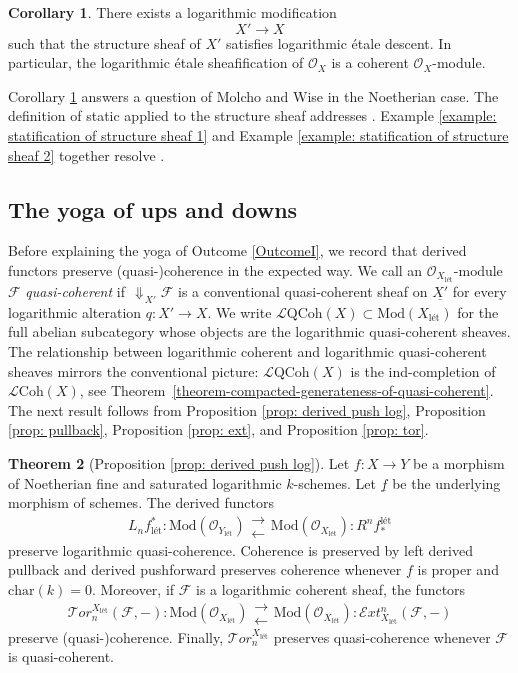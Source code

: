 \documentclass[11pt]{amsart}
\theoremstyle{definition}
\theoremstyle{definition}
\newtheorem{maintheorem}{Theorem}
\newtheorem{maincorollary}[maintheorem]{Corollary}
\DeclareMathOperator{\arrowdown}{\!\Downarrow\!}
\newcommand{\cE}{\mathcal{E}}
\newcommand{\cF}{\mathcal{F}}
\newcommand{\cL}{\mathcal{L}}
\newcommand{\cT}{\mathcal{T}}
\newcommand{\cal}{\mathcal}
\def\cE{{\cal E}}
\def\cF{{\cal F}}
\def\cL{{\cal L}}
\def\cT{{\cal T}}
\newcommand{\logqcoh}[1]{\cL \text{QCoh}(#1)}
\newcommand{\logcoh}[1]{\cL \text{Coh}(#1)}
\newcommand{\longleftrightarrows}{\mathrel{\substack{\textstyle\longrightarrow \\[-0.3ex] \textstyle\longleftarrow}}}
\begin{document}
\begin{maincorollary}\label{main corr:addressing Molcho Wise}
    There exists a logarithmic modification $$X'\longrightarrow X$$ such that the structure sheaf of $X'$ satisfies logarithmic \'etale descent. In particular, the logarithmic \'etale sheafification of $\mathcal{O}_X$ is a coherent $\mathcal{O}_X$-module.
\end{maincorollary}

Corollary \ref{main corr:addressing Molcho Wise} answers a question of Molcho and Wise \cite[Question 1.7.1]{molcho2023remarks} in the Noetherian case. The definition of static applied to the structure sheaf addresses \cite[Question 1.7.2]{molcho2023remarks}. Example \ref{example: statification of structure sheaf 1} and Example \ref{example: statification of structure sheaf 2} together resolve \cite[Question 1.7.3]{molcho2023remarks}. 

\subsection{The yoga of ups and downs} 
Before explaining the yoga of Outcome \ref{OutcomeI}, we record that derived functors preserve (quasi-)coherence in the expected way. We call an $\mathcal{O}_{X_{\text{l\'et}}}\text{-module}$ $\mathcal{F}$ \textit{quasi-coherent} if $\arrowdown_{X'}\!\mathcal{F}$
    is a conventional quasi-coherent sheaf on $\underline{X'}$ for every logarithmic alteration $q\colon X'\rightarrow X$. We write $\logqcoh{X}\subset \text{Mod}(X_{\text{l\'et}})$ for the full abelian subcategory whose objects are the logarithmic quasi-coherent sheaves. The relationship between logarithmic coherent and logarithmic quasi-coherent sheaves mirrors the conventional picture: $\logqcoh{X}$ is the ind-completion of $\logcoh{X}$, see Theorem~\ref{theorem-compacted-generateness-of-quasi-coherent}. The next result follows from Proposition \ref{prop: derived push log}, Proposition \ref{prop: pullback}, Proposition \ref{prop: ext}, and Proposition \ref{prop: tor}.

\begin{maintheorem}[Proposition \ref{prop: derived push log}]\label{main thm: (quasi)coherence preserved}
    Let $f\colon X\rightarrow Y$ be a morphism of Noetherian fine and saturated logarithmic $k$-schemes. Let $\underline{f}$ be the underlying morphism of schemes.  
    The derived functors $$L_nf_{\text{l\'et}}^*\colon \text{Mod}(\mathcal{O}_{Y_{\text{l\'et}}})\longleftrightarrows \text{Mod}(\mathcal{O}_{X_{\text{l\'et}}})\colon R^nf^\text{l\'et}_*$$ preserve logarithmic quasi-coherence. Coherence is preserved by left derived pullback and derived pushforward preserves coherence whenever $f$ is proper and $\text{char}(k)=0$. Moreover, if $\cF$ is a logarithmic coherent sheaf, the functors
    $$\cT or_n^{X_{\text{l\'et}}} (\cF,-)\colon \text{Mod}(\mathcal{O}_{X_{\text{l\'et}}})\longleftrightarrows \text{Mod}(\mathcal{O}_{X_{\text{l\'et}}})\colon \cE xt^{n}_{X_{\text{l\'et}}}(\cF,-) $$
    preserve (quasi-)coherence. Finally, $\cT or_n^{X_{\text{l\'et}}}$ preserves quasi-coherence whenever $\mathcal{F}$ is quasi-coherent. 
\end{maintheorem}
\end{document}
